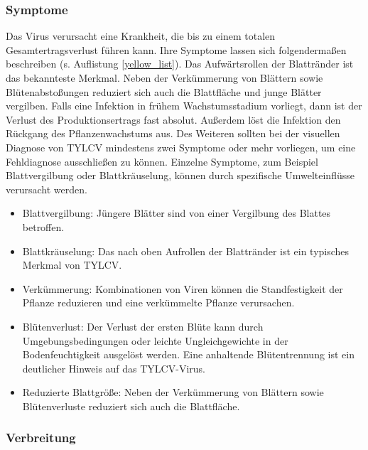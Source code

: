 \subsubsection{Symptome}

Das Virus verursacht eine Krankheit, die bis zu einem totalen Gesamtertragsverlust führen kann\cite{leaf_curl}. Ihre Symptome lassen sich folgendermaßen beschreiben (s. Auflistung \ref{yellow_list}). Das Aufwärtsrollen der Blattränder ist das bekannteste Merkmal. Neben der Verkümmerung von Blättern sowie Blütenabstoßungen reduziert sich auch die Blattfläche und junge Blätter vergilben. Falls eine Infektion in frühem Wachstumsstadium vorliegt, dann ist der Verlust des Produktionsertrags fast absolut. Außerdem löst die Infektion den Rückgang des Pflanzenwachstums aus. Des Weiteren sollten bei der visuellen Diagnose von TYLCV mindestens zwei Symptome oder mehr vorliegen, um eine Fehldiagnose ausschließen zu können. Einzelne Symptome, zum Beispiel Blattvergilbung oder Blattkräuselung, können durch spezifische Umwelteinflüsse verursacht werden. 

\begin{itemize}
	\label{yellow_list}
	\item Blattvergilbung: Jüngere Blätter sind von einer Vergilbung des Blattes betroffen.
	
	\item Blattkräuselung: Das nach oben Aufrollen der Blattränder ist ein typisches Merkmal von TYLCV.
	
	\item Verkümmerung: Kombinationen von Viren können die Standfestigkeit der Pflanze reduzieren und eine verkümmelte Pflanze verursachen. 
	
	\item Blütenverlust: Der Verlust der ersten Blüte kann durch Umgebungsbedingungen oder leichte Ungleichgewichte in der Bodenfeuchtigkeit ausgelöst werden. Eine anhaltende Blütentrennung ist ein deutlicher Hinweis auf das TYLCV-Virus.
	
	\item Reduzierte Blattgröße: Neben der Verkümmerung von Blättern sowie Blütenverluste reduziert sich auch die Blattfläche.
\end{itemize}

\subsubsection{Verbreitung}



